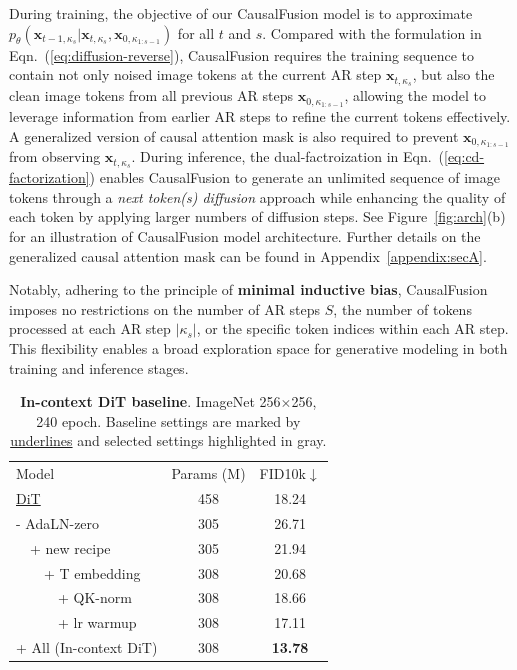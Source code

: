 During training, the objective of our CausalFusion model is to approximate $p_\theta(\mathbf{x}_{t-1,\kappa_s} | \mathbf{x}_{t,\kappa_s},\mathbf{x}_{0,\kappa_{1:s-1}})$ for all $t$ and $s$. Compared with the formulation in Eqn.~(\ref{eq:diffusion-reverse}),
CausalFusion requires the training sequence to contain not only noised image tokens at the current AR step $\mathbf{x}_{t,\kappa_s}$, but also the clean image tokens from all previous AR steps $\mathbf{x}_{0,\kappa_{1:s-1}}$, allowing the model to leverage information from earlier AR steps to refine the current tokens effectively.
A generalized version of causal attention mask is also required to prevent $\mathbf{x}_{0,\kappa_{1:s-1}}$ from observing $\mathbf{x}_{t,\kappa_s}$.
During inference, the dual-factroization in Eqn.~(\ref{eq:cd-factorization}) enables CausalFusion to generate an unlimited sequence of image tokens through a \textit{next token(s) diffusion} approach while enhancing the quality of each token by applying larger numbers of diffusion steps. See Figure~\ref{fig:arch}(b) for an illustration of CausalFusion model architecture. Further details on the generalized causal attention mask can be found in Appendix~\ref{appendix:secA}.

Notably, adhering to the principle of \textbf{minimal inductive bias}, CausalFusion imposes no restrictions on the number of AR steps $S$, the number of tokens processed at each AR step $|\kappa_s|$, or the specific token indices within each AR step. This flexibility enables a broad exploration space for generative modeling in both training and inference stages.

\begin{table}[t]
\footnotesize
\centering
\begin{tabular}{l|cc}
Model & Params (M) & FID10k$\downarrow$ \\ 
\shline
\underline{DiT}~\cite{dit} & 458 & {18.24}  \\
\hline
{- AdaLN-zero}~\cite{dit} & {305} & {26.71} \\
~~+ new recipe & 305 & {21.94}   \\
~~~~+ T embedding & 308 & {20.68}  \\
~~~~~~+ QK-norm & 308 & {18.66} \\
~~~~~~+ lr warmup & 308 & 17.11 \\
\hline
\colorbox{gray!30}{+ All} (In-context DiT) & 308 &  \textbf{13.78}
\end{tabular}
\caption{\textbf{In-context DiT baseline}. ImageNet 256$\times$256, 240 epoch. Baseline settings are marked by \underline{underlines} and selected settings highlighted in \colorbox{gray!30}{gray}.
\vspace{-6pt}
}
\label{tab:in-context-dit}
\end{table}

